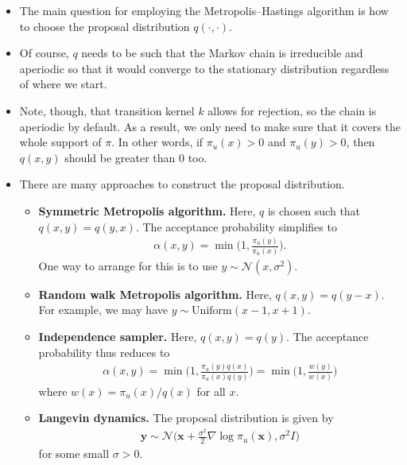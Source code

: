 \documentclass[10pt]{article}
\newcommand{\ve}[1]{\mathbf{#1}}
\newcommand{\mrm}[1]{\mathrm{#1}}
\newcommand{\mcal}[1]{\mathcal{#1}}
\begin{document}
\begin{itemize}
  \item The main question for employing the Metropolis--Hastings algorithm is how to choose the proposal distribution $q(\cdot, \cdot)$.
  
  \item Of course, $q$ needs to be such that the Markov chain is irreducible and aperiodic so that it would converge to the stationary distribution regardless of where we start.
    
  \item Note, though, that transition kernel $k$ allows for rejection, so the chain is aperiodic by default. As a result, we only need to make sure that it covers the whole support of $\pi$. In other words, if $\pi_u(x) > 0$ and $\pi_u(y) > 0$, then $q(x,y)$ should be greater than $0$ too.  

  \item There are many approaches to construct the proposal distribution.
  \begin{itemize}
    \item {\bf Symmetric Metropolis algorithm.} Here, $q$ is chosen such that $q(x,y) = q(y,x)$. The acceptance probability simplifies to
    \begin{align*}
      \alpha(x,y) = \min\bigg( 1, \frac{\pi_u(y)}{\pi_u(x)} \bigg).
    \end{align*}
    One way to arrange for this is to use $y \sim \mcal{N}(x, \sigma^2)$.

    \item {\bf Random walk Metropolis algorithm.} Here, $q(x,y) = q(y-x)$. For example, we may have $y \sim \mrm{Uniform}(x-1, x+1)$.
    
    \item {\bf Independence sampler.} Here, $q(x,y) = q(y)$. The acceptance probability thus reduces to
    \begin{align*}
      \alpha(x,y) 
      = \min\bigg( 1, \frac{\pi_u(y)q(x)}{\pi_u(x)q(y)} \bigg)
      = \min\bigg( 1, \frac{w(y)}{w(x)} \bigg)
    \end{align*}
    where $w(x) = \pi_u(x)/q(x)$ for all $x$.

    \item {\bf Langevin dynamics.} The proposal distribution is given by
    \begin{align*}
      \ve{y} \sim \mcal{N}\Big(\ve{x} + \frac{\sigma^2}{2} \nabla \log \pi_u(\ve{x}), \sigma^2 I \Big) 
    \end{align*}
    for some small $\sigma > 0$.    
  \end{itemize}


\end{itemize}
\end{document}
